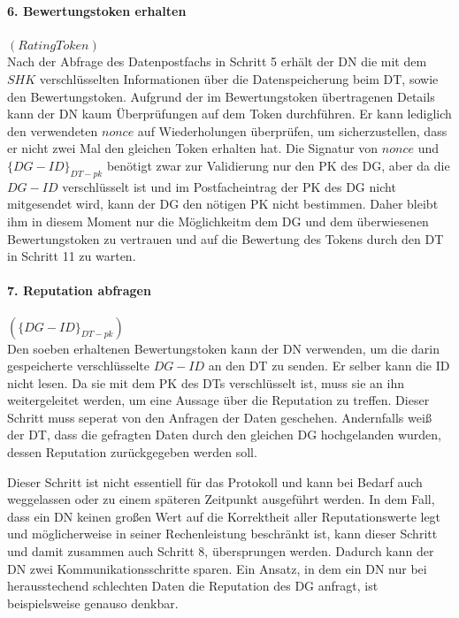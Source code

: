 \documentclass[
	fontsize=11pt,
	headings=small,
	parskip=half,           %
	bibliography=totoc,
	numbers=noenddot,       %
	open=any,               %
]{scrreprt}
\begin{document}
\paragraph{6. Bewertungstoken erhalten}$(RatingToken)$\\
Nach der Abfrage des Datenpostfachs in Schritt 5 erhält der DN die mit dem $SHK$ verschlüsselten Informationen über die Datenspeicherung beim DT, sowie den Bewertungstoken. Aufgrund der im Bewertungstoken übertragenen Details kann der DN kaum Überprüfungen auf dem Token durchführen. Er kann lediglich den verwendeten $nonce$ auf Wiederholungen überprüfen, um sicherzustellen, dass er nicht zwei Mal den gleichen Token erhalten hat. Die Signatur von $nonce$ und ${\{DG-ID\}}_{DT-pk}$ benötigt zwar zur Validierung nur den PK des DG, aber da die $DG-ID$ verschlüsselt ist und im Postfacheintrag der PK des DG nicht mitgesendet wird, kann der DG den nötigen PK nicht bestimmen. Daher bleibt ihm in diesem Moment nur die Möglichkeitm dem DG und dem überwiesenen Bewertungstoken zu vertrauen und auf die Bewertung des Tokens durch den DT in Schritt 11 zu warten.

\paragraph{7. Reputation abfragen}$({\{DG-ID\}}_{DT-pk})$\\
Den soeben erhaltenen Bewertungstoken kann der DN verwenden, um die darin gespeicherte verschlüsselte $DG-ID$ an den DT zu senden. Er selber kann die ID nicht lesen. Da sie mit dem PK des DTs verschlüsselt ist, muss sie an ihn weitergeleitet werden, um eine Aussage über die Reputation zu treffen. Dieser Schritt muss seperat von den Anfragen der Daten geschehen. Andernfalls weiß der DT, dass die gefragten Daten durch den gleichen DG hochgelanden wurden, dessen Reputation zurückgegeben werden soll.

Dieser Schritt ist nicht essentiell für das Protokoll und kann bei Bedarf auch weggelassen oder zu einem späteren Zeitpunkt ausgeführt werden. In dem Fall, dass ein DN keinen großen Wert auf die Korrektheit aller Reputationswerte legt und möglicherweise in seiner Rechenleistung beschränkt ist, kann dieser Schritt und damit zusammen auch Schritt 8, übersprungen werden. Dadurch kann der DN zwei Kommunikationsschritte sparen. Ein Ansatz, in dem ein DN nur bei herausstechend schlechten Daten die Reputation des DG anfragt, ist beispielsweise genauso denkbar.
\end{document}
